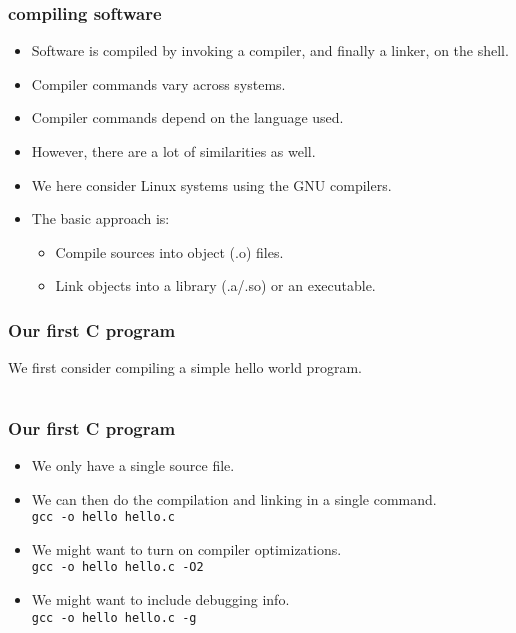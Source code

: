 \begin{frame}
  \frametitle{compiling software}
  \begin{itemize}
  \item Software is compiled by invoking a compiler, and finally a linker, on the shell.
  \item Compiler commands vary across systems.
  \item Compiler commands depend on the language used.
  \item However, there are a lot of similarities as well.
  \item We here consider Linux systems using the GNU compilers.
  \item The basic approach is:
    \begin{itemize}
    \item Compile sources into object (.o) files.
    \item Link objects into a library (.a/.so) or an executable.
    \end{itemize}
  \end{itemize}
\end{frame}

\begin{frame}[fragile]
  \frametitle{Our first C program}
  We first consider compiling a simple hello world program.
  \begin{center}
    \begin{tabular}{c}
      
    \end{tabular}
  \end{center}
\end{frame}

\begin{frame}
  \frametitle{Our first C program}
  \begin{itemize}
  \item We only have a single source file.
  \item We can then do the compilation and linking in a single command. \\
    \texttt{gcc -o hello hello.c}
  \item We might want to turn on compiler optimizations. \\
    \texttt{gcc -o hello hello.c -O2}
  \item We might want to include debugging info. \\
    \texttt{gcc -o hello hello.c -g}
  \end{itemize}
\end{frame}

